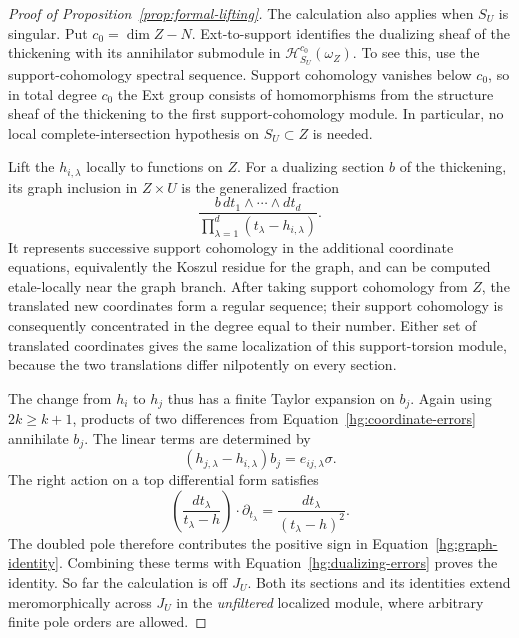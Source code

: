 \begin{proof}[Proof of Proposition~\ref{prop:formal-lifting}]
The calculation also applies when \(S_U\) is singular.  Put
\(c_0=\dim Z-N\).  Ext-to-support identifies the dualizing
sheaf of the thickening with its annihilator submodule in
\(\mathcal H^{c_0}_{S_U}(\omega_Z)\).  To see this, use the
support-cohomology spectral sequence.  Support cohomology
vanishes below \(c_0\), so in total degree \(c_0\) the Ext
group consists of homomorphisms from the structure sheaf of
the thickening to the first support-cohomology module.  In
particular, no local complete-intersection hypothesis on
\(S_U\subset Z\) is needed.

Lift the \(h_{i,\lambda}\) locally to functions on \(Z\).
For a dualizing section \(b\) of the thickening, its graph
inclusion in \(Z\times U\) is the generalized fraction
\[
 \frac{b\,dt_1\wedge\cdots\wedge dt_d}
      {\prod_{\lambda=1}^d(t_\lambda-h_{i,\lambda})}.
\]
It represents successive support cohomology in the additional
coordinate equations, equivalently the Koszul residue for the
graph, and can be computed etale-locally near the graph branch.
After taking support cohomology from \(Z\), the translated
new coordinates form a regular sequence; their support
cohomology is consequently concentrated in the degree equal
to their number.  Either set of translated coordinates gives
the same localization of this support-torsion module, because
the two translations differ nilpotently on every section.

The change from \(h_i\) to \(h_j\) thus has a finite Taylor
expansion on \(b_j\).  Again using \(2k\geq k+1\), products
of two differences from Equation~\eqref{hg:coordinate-errors}
annihilate \(b_j\).  The linear terms are determined by
\[
 (h_{j,\lambda}-h_{i,\lambda})b_j
       =e_{ij,\lambda}\sigma.
\]
The right action on a top differential form satisfies
\[
 \left(\frac{dt_\lambda}{t_\lambda-h}\right)
       \cdot\partial_{t_\lambda}
   =\frac{dt_\lambda}{(t_\lambda-h)^2}.
\]
The doubled pole therefore contributes the positive sign in
Equation~\eqref{hg:graph-identity}.  Combining these terms
with Equation~\eqref{hg:dualizing-errors} proves the identity.
So far the calculation is off \(J_U\).  Both its sections
and its identities extend meromorphically across \(J_U\) in
the \emph{unfiltered} localized module, where arbitrary finite
pole orders are allowed.


\end{proof}
